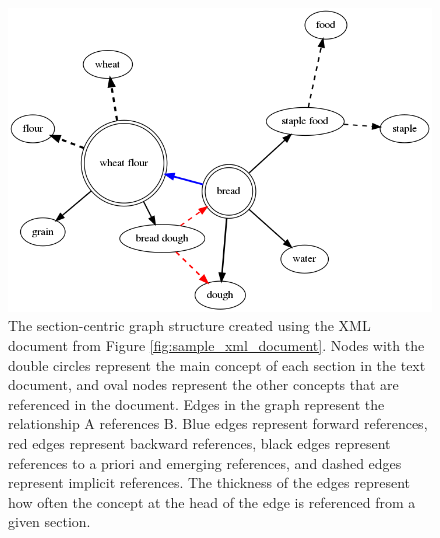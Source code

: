 \documentclass[12pt]{article}
\begin{document}

\begin{figure}
    \centering
    \includegraphics[width=\linewidth]{figures/bread_graph.png}
    \caption{The section-centric graph structure created using the XML document from Figure \ref{fig:sample_xml_document}. Nodes with the double circles represent the main concept of each section in the text document, and oval nodes represent the other concepts that are referenced in the document. Edges in the graph represent the relationship A references B. Blue edges represent forward references, red edges represent backward references, black edges represent references to a priori and emerging references, and dashed edges represent implicit references.
    The thickness of the edges represent how often the concept at the head of the edge is referenced from a given section.}
    \label{fig:graph_example}
\end{figure}
\end{document}
